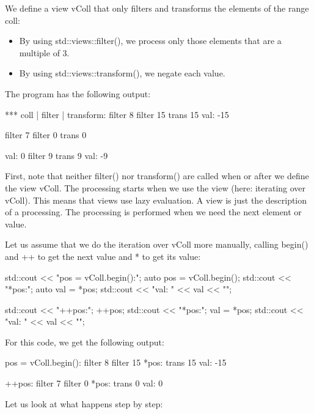 We define a view vColl that only filters and transforms the elements of the range coll:

\begin{itemize}
\item
By using std::views::filter(), we process only those elements that are a multiple of 3.

\item
By using std::views::transform(), we negate each value.
\end{itemize}

The program has the following output:

{\footnotesize
\begin{shell}
*** coll | filter | transform:
filter 8
filter 15
trans 15
val: -15

filter 7
filter 0
trans 0

val: 0
filter 9
trans 9
val: -9
\end{shell}
}

First, note that neither filter() nor transform() are called when or after we define the view vColl. The processing starts when we use the view (here: iterating over vColl). This means that views use lazy evaluation. A view is just the description of a processing. The processing is performed when we need the next element or value.

Let us assume that we do the iteration over vColl more manually, calling begin() and ++ to get the next value and * to get its value:

\begin{cpp}
std::cout << "pos = vColl.begin():\n";
auto pos = vColl.begin();
std::cout << "*pos:\n";
auto val = *pos;
std::cout << "val: " << val << "\n\n";

std::cout << "++pos:\n";
++pos;
std::cout << "*pos:\n";
val = *pos;
std::cout << "val: " << val << "\n\n";
\end{cpp}

For this code, we get the following output:

{\footnotesize
\begin{shell}
pos = vColl.begin():
filter 8
filter 15
*pos:
trans 15
val: -15

++pos:
filter 7
filter 0
*pos:
trans 0
val: 0
\end{shell}
}

Let us look at what happens step by step:

